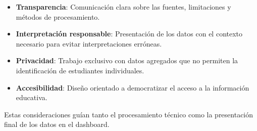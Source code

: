 \begin{itemize}
    \item \textbf{Transparencia}: Comunicación clara sobre las fuentes, limitaciones y métodos de procesamiento.
    \item \textbf{Interpretación responsable}: Presentación de los datos con el contexto necesario para evitar interpretaciones erróneas.
    \item \textbf{Privacidad}: Trabajo exclusivo con datos agregados que no permiten la identificación de estudiantes individuales.
    \item \textbf{Accesibilidad}: Diseño orientado a democratizar el acceso a la información educativa.
\end{itemize}

Estas consideraciones guían tanto el procesamiento técnico como la presentación final de los datos en el dashboard.
